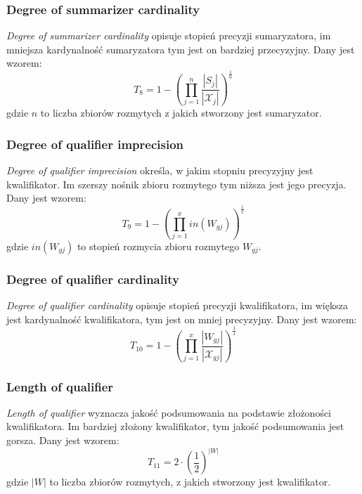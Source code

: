 \documentclass{classrep}
\begin{document}
	\subsubsection{Degree of summarizer cardinality}
\textsl{Degree of summarizer cardinality} opisuje stopień precyzji sumaryzatora, im mniejsza kardynalność sumaryzatora tym jest on bardziej przecyzyjny. Dany jest wzorem:
\begin{equation}
T_8 = 1- \left(\prod_{j=1}^{n} \frac{|S_j|}{|\mathcal{X}_j|}\right)^{\frac{1}{n}}
\end{equation}
gdzie $n$ to liczba zbiorów rozmytych z jakich stworzony jest sumaryzator.


	\subsubsection{Degree of qualifier imprecision}
\textsl{Degree of qualifier imprecision} określa, w jakim stopniu precyzyjny jest kwalifikator. Im szerszy nośnik zbioru rozmytego tym niższa jest jego precyzja. Dany jest wzorem:
\begin{equation}
T_{9} = 1 - \left(\prod_{j=1}^{x} in(W_{gj})\right)^{\frac{1}{x}}
\end{equation}
gdzie $in(W_{gj})$ to stopień rozmycia zbioru rozmytego $W_{gj}$.


	\subsubsection{Degree of qualifier cardinality}
\textsl{Degree of qualifier cardinality} opisuje stopień precyzji kwalifikatora, im większa jest kardynalność kwalifikatora, tym jest on mniej precyzyjny. Dany jest wzorem:
\begin{equation}
T_{10} = 1- \left(\prod_{j=1}^{x} \frac{|W_{gj}|}{|\mathcal{X}_{gj}|}\right)^{\frac{1}{x}}
\end{equation}


	\subsubsection{Length of qualifier}
\textsl{Length of qualifier} wyznacza jakość podsumowania na podstawie złożoności kwalifikatora. Im bardziej złożony kwalifikator, tym jakość podsumowania jest gorsza. Dany jest wzorem:
\begin{equation}
T_{11} = 2 \cdot \left(\frac{1}{2}\right)^{|W|}
\end{equation}
gdzie $|W|$ to liczba zbiorów rozmytych, z jakich stworzony jest kwalifikator.
\end{document}
